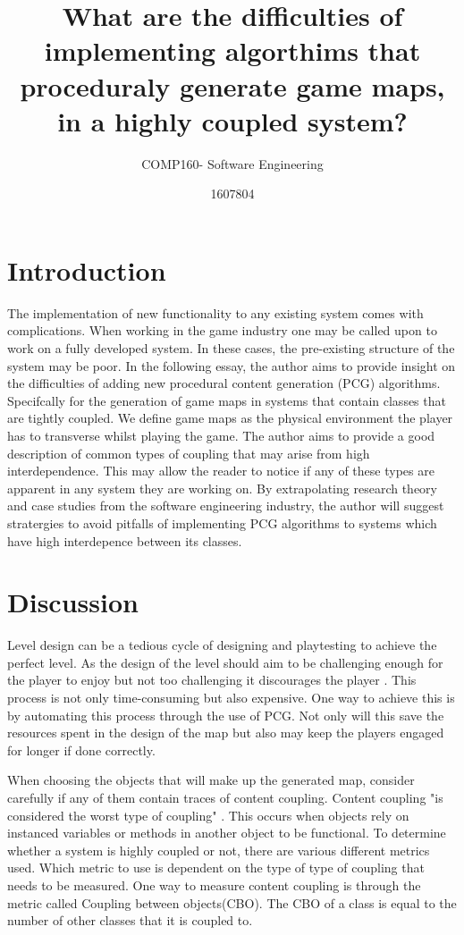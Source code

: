 \documentclass{scrartcl}
\title{What are the difficulties of implementing algorthims that proceduraly generate game maps, in a highly coupled system?}
\subtitle{COMP160- Software Engineering}
\author{1607804}
\begin{document}
\maketitle


\section{Introduction}
The implementation of new functionality to any existing system comes with complications. When working in the game industry one may be called upon to work on a fully developed system. In these cases, the pre-existing structure of the system may be poor. In the following essay, the author aims to provide insight on the difficulties of adding new procedural content generation (PCG) algorithms. Specifcally for the generation of  game maps in systems that contain classes that are tightly coupled. We define game maps as the physical environment the player has to transverse whilst playing the game. The author aims to provide a good description of common types of coupling that may arise from high interdependence. This may allow the reader to notice if any of these types are apparent in any system they are working on. By extrapolating research theory and case studies from the software engineering industry, the author will suggest stratergies to avoid pitfalls of implementing PCG algorithms to systems which have high interdepence between its classes. 

\section{Discussion}
 Level design can be a tedious cycle of designing and playtesting to achieve the perfect level. As the design of the level should aim to be challenging enough for the player to enjoy but not too challenging it discourages the player \cite {kayali2011retro}. This process is not only time-consuming but also expensive. One way to achieve this is by automating this process through the use of PCG. Not only will this save the resources spent in the design of the map but also may keep the players engaged for longer if done correctly.

When choosing the objects that will make up the generated map, consider carefully if any of them contain traces of content coupling. Content coupling "is considered the worst type of coupling" \cite[p. 95]{briand1999unified}. This occurs when objects rely on instanced variables or methods in another object to be functional.  To determine whether a system is highly coupled or not, there are various different metrics used. Which metric to use is dependent on the type of type of coupling that needs to be measured. One way to measure content coupling is through the metric called Coupling between objects(CBO)\cite {chidamber1994metrics}. The CBO of a class is equal to the number of other classes that it is coupled to.
\end{document}
